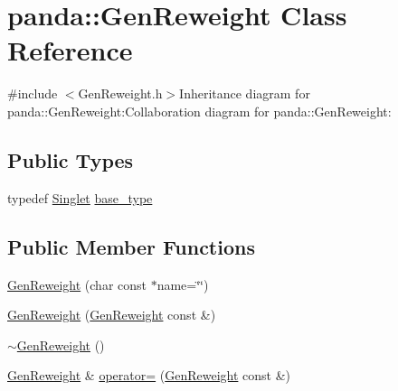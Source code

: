 \hypertarget{classpanda_1_1GenReweight}{
\section{panda::GenReweight Class Reference}
\label{classpanda_1_1GenReweight}
}


{\ttfamily \#include $<$GenReweight.h$>$}Inheritance diagram for panda::GenReweight:Collaboration diagram for panda::GenReweight:\subsection*{Public Types}
\begin{DoxyCompactItemize}
\item 
typedef \hyperlink{classpanda_1_1Singlet}{Singlet} \hyperlink{classpanda_1_1GenReweight_ada54555efb9e53c8d27891ab5ead6ef5}{base\_\-type}
\end{DoxyCompactItemize}
\subsection*{Public Member Functions}
\begin{DoxyCompactItemize}
\item 
\hyperlink{classpanda_1_1GenReweight_ae943542cdd41bccabf28c8221282a274}{GenReweight} (char const $\ast$name=\char`\"{}\char`\"{})
\item 
\hyperlink{classpanda_1_1GenReweight_ad7f13e4845484285cdf1eb1b74d325c5}{GenReweight} (\hyperlink{classpanda_1_1GenReweight}{GenReweight} const \&)
\item 
\hyperlink{classpanda_1_1GenReweight_a0e50cc06e0930a7b5516e448df2a00c5}{$\sim$GenReweight} ()
\item 
\hyperlink{classpanda_1_1GenReweight}{GenReweight} \& \hyperlink{classpanda_1_1GenReweight_a6dd54fb7e34a557beaf06698662a6831}{operator=} (\hyperlink{classpanda_1_1GenReweight}{GenReweight} const \&)
\end{DoxyCompactItemize}
